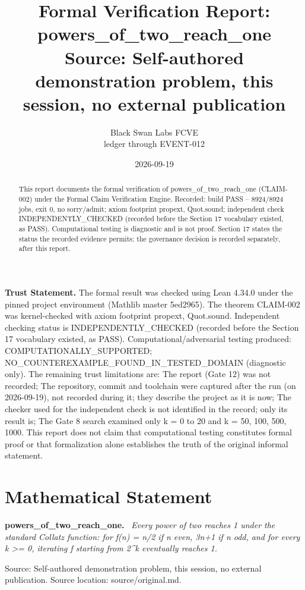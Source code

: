 \documentclass[11pt]{article}
\title{Formal Verification Report: powers\_of\_two\_reach\_one\\[0.5em]{\large Source: Self-authored demonstration problem, this session, no external publication}}
\author{Black Swan Labs FCVE \\ ledger through EVENT-012}
\date{2026-09-19}
\newenvironment{sourceresult}[1]{\par\medskip\noindent\textbf{#1.}\ \itshape}{\par\medskip}
\begin{document}
\maketitle

\noindent\textbf{Trust Statement.} The formal result was checked using Lean 4.34.0 under the pinned project environment (Mathlib master 5ed2965). The theorem CLAIM-002 was kernel-checked with axiom footprint propext, Quot.sound. Independent checking status is INDEPENDENTLY\_CHECKED (recorded before the Section 17 vocabulary existed, as PASS). Computational/adversarial testing produced: COMPUTATIONALLY\_SUPPORTED; NO\_COUNTEREXAMPLE\_FOUND\_IN\_TESTED\_DOMAIN (diagnostic only). The remaining trust limitations are: The report (Gate 12) was not recorded; The repository, commit and toolchain were captured after the run (on 2026-09-19), not recorded during it; they describe the project as it is now; The checker used for the independent check is not identified in the record; only its result is; The Gate 8 search examined only k = 0 to 20 and k = 50, 100, 500, 1000. This report does not claim that computational testing constitutes formal proof or that formalization alone establishes the truth of the original informal statement.

\begin{abstract}
This report documents the formal verification of powers\_of\_two\_reach\_one (CLAIM-002) under the Formal Claim Verification Engine. Recorded: build PASS -- 8924/8924 jobs, exit 0, no sorry/admit; axiom footprint propext, Quot.sound; independent check INDEPENDENTLY\_CHECKED (recorded before the Section 17 vocabulary existed, as PASS). Computational testing is diagnostic and is not proof. Section 17 states the status the recorded evidence permits; the governance decision is recorded separately, after this report.
\end{abstract}

\section{Mathematical Statement}
\begin{sourceresult}{powers\_of\_two\_reach\_one}
Every power of two reaches 1 under the standard Collatz function: for f(n) = n/2 if n even, 3n+1 if n odd, and for every k >= 0, iterating f starting from 2\textasciicircum{}k eventually reaches 1.
\end{sourceresult}
Source: Self-authored demonstration problem, this session, no external publication. Source location: source/original.md.
\end{document}
